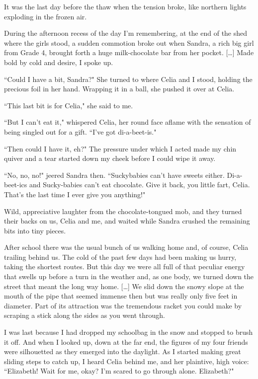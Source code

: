 \documentclass[10pt,a4paper]{article}
\newcommand{\qm}[1]{``#1"}
\begin{document}
It was the last day before the thaw when the tension broke, like northern lights exploding in the frozen air.

During the afternoon recess of the day I'm remembering, at the end of the shed where the girls stood, a sudden commotion broke out when Sandra, a rich big girl from Grade 4, brought forth a huge milk-chocolate bar from her pocket. [\ldots] Made bold by cold and desire, I spoke up.

\qm{Could I have a bit, Sandra?} She turned to where Celia and I stood, holding the precious foil in her hand. Wrapping it in a ball, she pushed it over at Celia.

\qm{This last bit is for Celia,} she said to me.

\qm{But I can't eat it,} whispered Celia, her round face aflame with the sensation of being singled out for a gift. \qm{I've got di-a-beet-is.}

\qm{Then could I have it, eh?} The pressure under which I acted made my chin quiver and a tear started down my cheek before I could wipe it away.

\qm{No, no, no!} jeered Sandra then. \qm{Suckybabies can't have sweets either. Di-a-beet-ics and Sucky-babies can't eat chocolate. Give it back, you little fart, Celia. That's the last time I ever give you anything!}

Wild, appreciative laughter from the chocolate-tongued mob, and they turned their backs on us, Celia and me, and waited while Sandra crushed the remaining bits into tiny pieces.

After school there was the usual bunch of us walking home and, of course, Celia trailing behind us. The cold of the past few days had been making us hurry, taking the shortest routes. But this day we were all full of that peculiar energy that swells up before a turn in the weather and, as one body, we turned down the street that meant the long way home. [\ldots] We slid down the snowy slope at the mouth of the pipe that seemed immense then but was really only five feet in diameter. Part of its attraction was the tremendous racket you could make by scraping a stick along the sides as you went through.

I was last because I had dropped my schoolbag in the snow and stopped to brush it off. And when I looked up, down at the far end, the figures of my four friends were silhouetted as they emerged into the daylight. As I started making great sliding steps to catch up, I heard Celia behind me, and her plaintive, high voice: \qm{Elizabeth! Wait for me, okay? I'm scared to go through alone. Elizabeth?}
\end{document}
